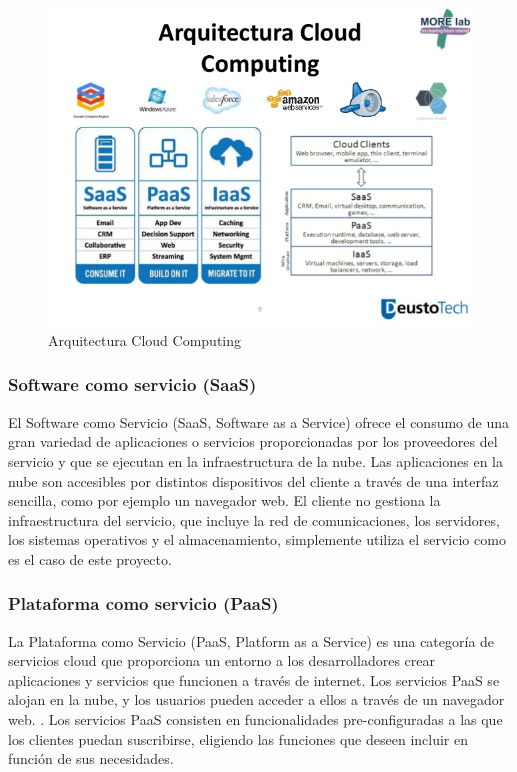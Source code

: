 \documentclass[a4paper,11pt]{book}
\begin{document}
\begin{figure}[H]
\centering
\includegraphics[scale=0.5]{imagenes/arquitecturaCC.jpg}
\caption{ Arquitectura Cloud Computing\cite{arquitecturaCC} }
\end{figure}

\subsubsection{Software como servicio (SaaS)}

El Software como Servicio\cite{saas} (SaaS, Software as a Service) ofrece el consumo de una gran variedad de aplicaciones o servicios proporcionadas por los proveedores del servicio y que se ejecutan en la infraestructura de la nube. Las aplicaciones en la nube son accesibles por distintos dispositivos del cliente a través de una interfaz sencilla, como por ejemplo un navegador web. El cliente no gestiona la infraestructura del servicio, que incluye la red de comunicaciones, los servidores, los sistemas operativos y el almacenamiento, simplemente utiliza el servicio como es el caso de este proyecto.

\subsubsection{Plataforma como servicio (PaaS)}

La Plataforma como Servicio\cite{paas} (PaaS, Platform as a Service) es una categoría de servicios cloud que proporciona un entorno a los desarrolladores crear aplicaciones y servicios que funcionen a través de internet. Los servicios PaaS se alojan en la nube, y los usuarios pueden acceder a ellos a través de un navegador web. . Los servicios PaaS consisten en funcionalidades pre-configuradas a las que los clientes puedan suscribirse, eligiendo las funciones que deseen incluir en función de sus necesidades.
\end{document}
